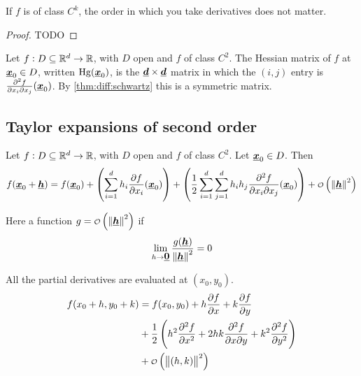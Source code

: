 \documentclass[12pt]{extarticle}
\renewcommand{\vec}[1]{\uvec{#1}}
\newcommand{\Hg}{{\operatorfont Hg}}
\begin{document}
\begin{theorem}[schwartz]
    \label{thm:diff:schwartz}
    If $f$ is of class $C^k$, the order in which you take derivatives does not matter.
\end{theorem}


\begin{proof}
    TODO
\end{proof}

\begin{definition}
    Let $f: D \subseteq \mathbb{R}^d \to \mathbb{R}$, with $D$ open and $f$ of class $C^2$.
    The Hessian matrix of $f$ at $\vec{x}_0 \in D$, written $\Hg(\vec{x}_0)$, is the $\vec{d} \times \vec{d}$ matrix in which the $(i, j)$ entry is $\pdv[2]{f}{x_i}{x_j}\/(\vec{x}_0)$.
    By \autoref{thm:diff:schwartz} this is a symmetric matrix.
\end{definition}

\subsection{Taylor expansions of second order}

\begin{theorem}
    Let $f: D \subseteq \mathbb{R}^d \to \mathbb{R}$, with $D$ open and $f$ of class $C^2$. Let $\vec x_0 \in D$.
    Then
    \begin{equation}
        f(\vec x_0 + \vec h) = f(\vec x_0) + \left( \sum^d_{i = 1} h_i \pdv{f}{x_i}\/(\vec x_0) \right) + \left(\frac{1}{2} \sum^d_{i = 1} \sum^d_{j = 1} h_i h_j \pdv[2]{f}{x_i}{x_j}\/(\vec x_0) \right) + \o\left(\norm{\vec h}^2\right)
    \end{equation}

    Here a function $g = \o\left(\norm{\vec h}^2\right)$ if
    \begin{equation}
        \lim_{h \to \vec 0} \frac{g(\vec h)}{\norm{\vec h}^2} = 0
    \end{equation}
\end{theorem}

\begin{example}[$d = 2$]
    All the partial derivatives are evaluated at $(x_0, y_0)$.
    \begin{align}
        f(x_0 + h, y_0 + k) & = f(x_0, y_0) + h \pdv{f}{x} + k \pdv{f}{y}                                                                              \\
                            & + \frac{1}{2} \left( h^2 \pdv[2]{f}{x} + 2hk \pdv[2]{f}{x}{y} + k^2 \pdv[2]{f}{y} \right) \label{eq:taylor:second_order} \\
                            & + \o \left( \norm{(h, k)}^2 \right)
    \end{align}
\end{example}
\end{document}
